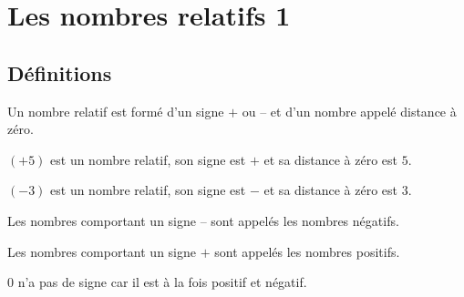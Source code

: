 \documentclass[a4paper,10pt]{report}
\begin{document}
\newpage
\setcounter{chapter}{0}
\chapter{Les nombres relatifs 1}

\section{Définitions}

\begin{defn}
Un nombre relatif est formé d'un signe $+$ ou $–$ et d'un nombre appelé distance à zéro.
\end{defn}

\begin{ex}
$(+5)$ est un nombre relatif, son signe est $+$ et sa distance à zéro est $5$.

\begin{center}
\end{center}

\medskip
\noindent $(-3)$ est un nombre relatif, son signe est $-$ et sa distance à zéro est $3$.

\begin{center}
\end{center}
\end{ex}

\begin{defn}
Les nombres comportant un signe $–$ sont appelés les nombres négatifs.

\noindent Les nombres comportant un signe $+$ sont appelés les nombres positifs.
\end{defn}

\begin{rem}
$0$ n'a pas de signe car il est à la fois positif et négatif.
\end{rem}
\end{document}

